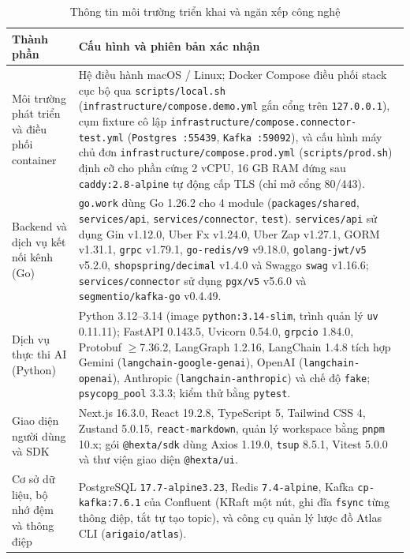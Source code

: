 \begin{table}[htbp]
  \centering
  \small
  \setlength{\tabcolsep}{4pt}
  \renewcommand{\arraystretch}{1.2}
  \caption{Thông tin môi trường triển khai và ngăn xếp công nghệ}\label{tab:environment}
  \begin{tabularx}{\linewidth}{@{}
    >{\raggedright\arraybackslash}p{3.9cm}
    >{\raggedright\arraybackslash}X@{}}
    \toprule
    Thành phần & Cấu hình và phiên bản xác nhận \\
    \midrule
    Môi trường phát triển và điều phối container &
    Hệ điều hành macOS / Linux; Docker Compose điều phối stack cục bộ qua \texttt{scripts/local.sh} (\texttt{infrastructure/compose.demo.yml} gắn cổng trên
    \texttt{127.0.0.1}),
    cụm fixture cô lập \texttt{infrastructure/compose.connector-test.yml} (\texttt{Postgres :55439}, \texttt{Kafka :59092}), và cấu hình máy chủ đơn
    \texttt{infrastructure/compose.prod.yml} (\texttt{scripts/prod.sh}) định cỡ cho phần cứng 2 vCPU, 16 GB RAM đứng sau \texttt{caddy:2.8-alpine} tự động cấp TLS (chỉ mở cổng 80/443). \\
    Backend và dịch vụ kết nối kênh (Go) &
    \texttt{go.work} dùng Go 1.26.2 cho 4 module (\texttt{packages/shared}, \texttt{services/api}, \texttt{services/connector}, \texttt{test}). \texttt{services/api} sử dụng Gin v1.12.0,
    Uber Fx v1.24.0, Uber Zap v1.27.1, GORM v1.31.1, \texttt{grpc} v1.79.1, \texttt{go-redis/v9} v9.18.0, \texttt{golang-jwt/v5} v5.2.0, \texttt{shopspring/decimal} v1.4.0 và
    Swaggo \texttt{swag} v1.16.6;
    \texttt{services/connector} sử dụng \texttt{pgx/v5} v5.6.0 và \texttt{segmentio/kafka-go} v0.4.49. \\
    Dịch vụ thực thi AI (Python) &
    Python 3.12--3.14 (image \texttt{python:3.14-slim}, trình quản lý \texttt{uv} 0.11.11); FastAPI 0.143.5, Uvicorn 0.54.0, \texttt{grpcio} 1.84.0, Protobuf $\ge$7.36.2,
    LangGraph 1.2.16,
    LangChain 1.4.8 tích hợp Gemini (\texttt{langchain-google-genai}), OpenAI (\texttt{langchain-openai}), Anthropic (\texttt{langchain-anthropic}) và chế độ \texttt{fake};
    \texttt{psycopg\_pool} 3.3.3; kiểm thử bằng \texttt{pytest}. \\
    Giao diện người dùng và SDK &
    Next.js 16.3.0, React 19.2.8, TypeScript 5, Tailwind CSS 4, Zustand 5.0.15, \texttt{react-markdown}, quản lý workspace bằng \texttt{pnpm} 10.x;
    gói \texttt{@hexta/sdk} dùng Axios 1.19.0, \texttt{tsup} 8.5.1, Vitest 5.0.0 và thư viện giao diện \texttt{@hexta/ui}. \\
    Cơ sở dữ liệu, bộ nhớ đệm và thông điệp &
    PostgreSQL \texttt{17.7-alpine3.23}, Redis \texttt{7.4-alpine}, Kafka \texttt{cp-\hspace{0pt}kafka:\hspace{0pt}7.6.1} của Confluent (KRaft một nút, ghi đĩa \texttt{fsync} từng thông điệp, tắt tự tạo topic), và công cụ quản lý
    lược đồ Atlas CLI (\texttt{arigaio/atlas}). \\
    \bottomrule
  \end{tabularx}
\end{table}

